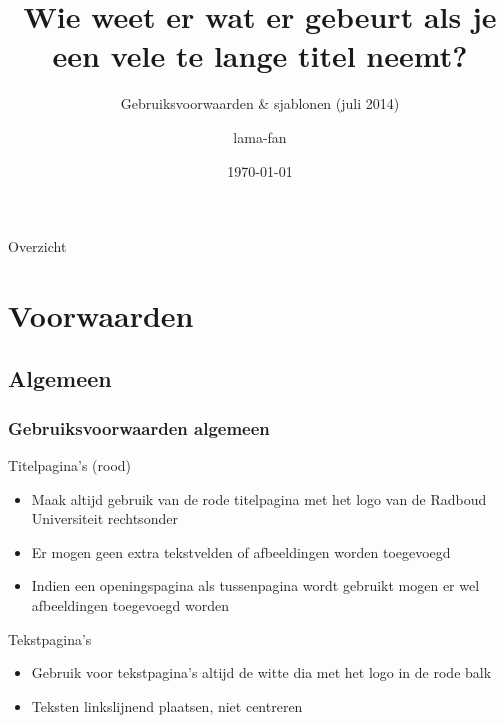 \documentclass[department=ds, notes={hide notes}, slidesperpage=4, handout, official=true]{beamerruhuisstijl}
\title{Wie weet er wat er gebeurt als je een vele te lange titel neemt?}
\subtitle{Gebruiksvoorwaarden \& sjablonen (juli 2014)}
\date{\today}
\author{lama-fan}
\begin{document}
\begin{frame}
    \titlepage
\end{frame}

\begin{frame}{Overzicht}
    \tableofcontents
\end{frame}

\section{Voorwaarden}
\subsection{Algemeen}
\begin{frame}
    \frametitle{Gebruiksvoorwaarden algemeen}

    \begin{block}{Titelpagina's (rood)}
        \begin{itemize}
            \item Maak altijd gebruik van de rode titelpagina met het logo van de Radboud Universiteit rechtsonder
            \item Er mogen geen extra tekstvelden of afbeeldingen worden toegevoegd
            \item Indien een openingspagina als tussenpagina wordt gebruikt mogen er wel afbeeldingen toegevoegd worden
        \end{itemize}
    \end{block}

    \begin{block}{Tekstpagina's}
        \begin{itemize}
            \item Gebruik voor tekstpagina's altijd de witte dia met het logo in de rode balk
            \item Teksten linkslijnend plaatsen, niet centreren
        \end{itemize}
    \end{block}
\end{frame} 
\end{document}
